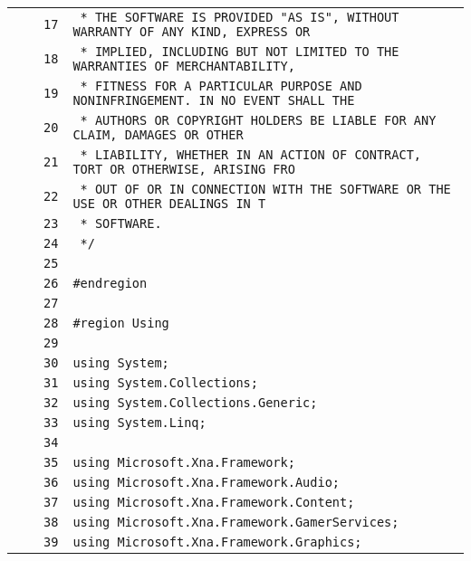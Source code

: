 \documentclass[a4paper,10pt]{article}
\begin{document}
\begin{longtable}[l]{lrrl}
\cellcolor{gray} &  & \verb~17~ & \verb~ * THE SOFTWARE IS PROVIDED "AS IS", WITHOUT WARRANTY OF ANY KIND, EXPRESS OR~\\
\cellcolor{gray} &  & \verb~18~ & \verb~ * IMPLIED, INCLUDING BUT NOT LIMITED TO THE WARRANTIES OF MERCHANTABILITY,~\\
\cellcolor{gray} &  & \verb~19~ & \verb~ * FITNESS FOR A PARTICULAR PURPOSE AND NONINFRINGEMENT. IN NO EVENT SHALL THE~\\
\cellcolor{gray} &  & \verb~20~ & \verb~ * AUTHORS OR COPYRIGHT HOLDERS BE LIABLE FOR ANY CLAIM, DAMAGES OR OTHER~\\
\cellcolor{gray} &  & \verb~21~ & \verb~ * LIABILITY, WHETHER IN AN ACTION OF CONTRACT, TORT OR OTHERWISE, ARISING FRO~\\
\cellcolor{gray} &  & \verb~22~ & \verb~ * OUT OF OR IN CONNECTION WITH THE SOFTWARE OR THE USE OR OTHER DEALINGS IN T~\\
\cellcolor{gray} &  & \verb~23~ & \verb~ * SOFTWARE.~\\
\cellcolor{gray} &  & \verb~24~ & \verb~ */~\\
\cellcolor{gray} &  & \verb~25~ & \verb~~\\
\cellcolor{gray} &  & \verb~26~ & \verb~#endregion~\\
\cellcolor{gray} &  & \verb~27~ & \verb~~\\
\cellcolor{gray} &  & \verb~28~ & \verb~#region Using~\\
\cellcolor{gray} &  & \verb~29~ & \verb~~\\
\cellcolor{gray} &  & \verb~30~ & \verb~using System;~\\
\cellcolor{gray} &  & \verb~31~ & \verb~using System.Collections;~\\
\cellcolor{gray} &  & \verb~32~ & \verb~using System.Collections.Generic;~\\
\cellcolor{gray} &  & \verb~33~ & \verb~using System.Linq;~\\
\cellcolor{gray} &  & \verb~34~ & \verb~~\\
\cellcolor{gray} &  & \verb~35~ & \verb~using Microsoft.Xna.Framework;~\\
\cellcolor{gray} &  & \verb~36~ & \verb~using Microsoft.Xna.Framework.Audio;~\\
\cellcolor{gray} &  & \verb~37~ & \verb~using Microsoft.Xna.Framework.Content;~\\
\cellcolor{gray} &  & \verb~38~ & \verb~using Microsoft.Xna.Framework.GamerServices;~\\
\cellcolor{gray} &  & \verb~39~ & \verb~using Microsoft.Xna.Framework.Graphics;~\\

\end{longtable}
\end{document}
